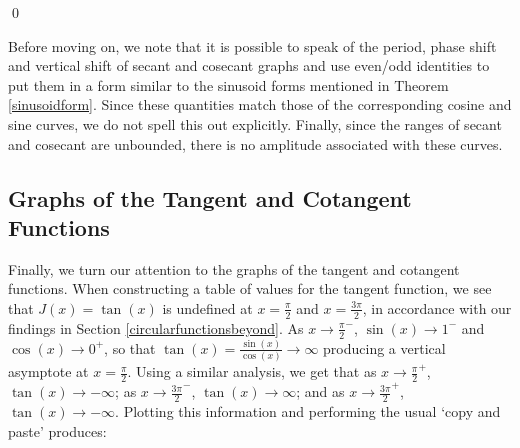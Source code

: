 \begin{ex}
\begin{enumerate}
\begin{tabular}{m{2.7in}m{3in}}
\end{tabular}

\vspace{-0.2in}  \qed

\end{enumerate}

\end{ex}

Before moving on, we note that it is possible to speak of the period, phase shift and vertical shift of secant and cosecant graphs and use even/odd identities to put them in a form similar to the sinusoid forms mentioned in Theorem \ref{sinusoidform}.  Since these quantities match those of the corresponding cosine and sine curves, we do not spell this out explicitly.  Finally, since the ranges of secant and cosecant are unbounded, there is no amplitude associated with these curves.

\subsection{Graphs of the Tangent and Cotangent Functions}

Finally, we turn our attention to the graphs of the tangent and cotangent functions.  When constructing a table of values for the tangent function, we see that $J(x) = \tan(x)$ is undefined at $x  = \frac{\pi}{2}$ and $x = \frac{3\pi}{2}$, in accordance with our findings in Section \ref{circularfunctionsbeyond}.  As $x \rightarrow \frac{\pi}{2}^{-}$, $\sin(x) \rightarrow 1^{-}$ and $\cos(x) \rightarrow 0^{+}$, so that $\tan(x)  = \frac{\sin(x)}{\cos(x)}\rightarrow \infty$ producing a vertical asymptote at $x = \frac{\pi}{2}$.  Using a similar analysis, we get that as $x \rightarrow \frac{\pi}{2}^{+}$, $\tan(x) \rightarrow -\infty$; as $x \rightarrow \frac{3\pi}{2}^{-}$, $\tan(x) \rightarrow \infty$; and as $x \rightarrow \frac{3\pi}{2}^{+}$, $\tan(x) \rightarrow -\infty$.  Plotting this information and performing the usual `copy and paste' produces: 


